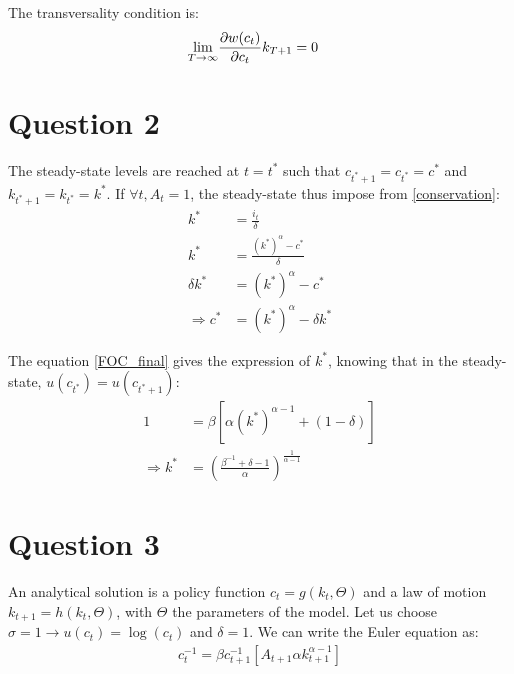 \documentclass[a4paper,12pt]{article}
\begin{document}



The transversality condition is:
\begin{align}
    \lim_{T \to \infty} & \pdv{w(c_t)}{c_t} k_{T+1} = 0
\end{align}

\section{Question 2}
The steady-state levels are reached at $t = t^*$ such that 
$c_{t^* + 1} = c_{t^*} = c^*$ and $k_{t^* + 1} = k_{t^*} = k^*$.
If $\forall t, A_t = 1 $, the steady-state thus impose from \eqref{conservation}: 
\begin{align}
    k^* & = \frac{i_t}{\delta} \\
    k^* & = \frac{(k^*)^\alpha - c^*}{\delta} \\
    \delta k^* & = (k^*)^\alpha - c^* \\
    \Rightarrow c^* & = (k^*)^\alpha - \delta k^* 
\end{align}

The equation \eqref{FOC_final} gives the expression of $k^*$, knowing that in the steady-state,
$u(c_{t^*}) = u(c_{t^* + 1})$:
\begin{align}
    1 & = \beta  [\alpha (k^*)^{\alpha - 1} + (1 - \delta)] \\
    \Rightarrow k^* & = (\frac{\beta^{-1} + \delta - 1}{\alpha})^{\frac{1}{\alpha - 1}}
\end{align}

\section{Question 3}

An analytical solution is a policy function $c_t = g(k_t, \Theta)$ and 
a law of motion $k_{t+1} = h(k_t, \Theta)$, with $\Theta$ the parameters of the model.
Let us choose $\sigma = 1 \rightarrow u(c_t) = \log(c_t)$ and $\delta = 1$.
We can write the Euler equation as:
\begin{align}
    {c^{-1}_t} = 
    \beta {c^{-1}_{t+1}} [A_{t+1} \alpha k_{t+1}^{\alpha - 1}] \label{new_EE}
\end{align}
\end{document}
